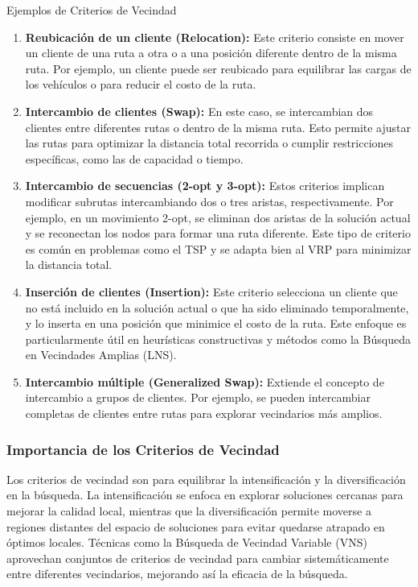 \documentclass[12pt]{article}
\begin{document}
Ejemplos de Criterios de Vecindad
\begin{enumerate}
\item
    \textbf{Reubicación de un cliente (Relocation):}
    Este criterio consiste en mover un cliente de una ruta a otra o a una posición diferente dentro de la misma ruta. Por ejemplo, un cliente puede ser reubicado para equilibrar las cargas de los vehículos o para reducir el costo de la ruta.
\item
    \textbf{Intercambio de clientes (Swap):}
    En este caso, se intercambian dos clientes entre diferentes rutas o dentro de la misma ruta. Esto permite ajustar las rutas para optimizar la distancia total recorrida o cumplir restricciones específicas, como las de capacidad o tiempo.
\item
    \textbf{Intercambio de secuencias (2-opt y 3-opt):}
    Estos criterios implican modificar subrutas intercambiando dos o tres aristas, respectivamente. Por ejemplo, en un movimiento 2-opt, se eliminan dos aristas de la solución actual y se reconectan los nodos para formar una ruta diferente. Este tipo de criterio es común en problemas como el TSP y se adapta bien al VRP para minimizar la distancia total.
\item
    \textbf{Inserción de clientes (Insertion):}
    Este criterio selecciona un cliente que no está incluido en la solución actual o que ha sido eliminado temporalmente, y lo inserta en una posición que minimice el costo de la ruta. Este enfoque es particularmente útil en heurísticas constructivas y métodos como la Búsqueda en Vecindades Amplias (LNS).
\item
    \textbf{Intercambio múltiple (Generalized Swap):}
    Extiende el concepto de intercambio a grupos de clientes. Por ejemplo, se pueden intercambiar  completas de clientes entre rutas para explorar vecindarios más amplios.
\end{enumerate}


\subsubsection{Importancia de los Criterios de Vecindad}

Los criterios de vecindad son  para equilibrar la intensificación y la diversificación en la búsqueda. La intensificación se enfoca en explorar soluciones cercanas para mejorar la calidad local, mientras que la diversificación permite moverse a regiones distantes del espacio de soluciones para evitar quedarse atrapado en óptimos locales. Técnicas como la Búsqueda de Vecindad Variable (VNS) aprovechan conjuntos de criterios de vecindad para cambiar sistemáticamente entre diferentes vecindarios, mejorando así la eficacia de la búsqueda.
\end{document}
